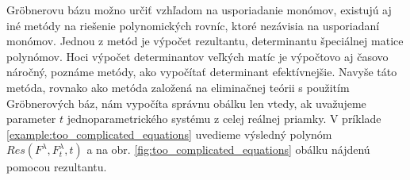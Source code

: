 Gröbnerovu bázu možno určiť vzhľadom na usporiadanie monómov, existujú aj iné metódy na riešenie polynomických rovníc, ktoré nezávisia na usporiadaní monómov. Jednou z metód je výpočet rezultantu, determinantu špeciálnej matice polynómov.
Hoci výpočet determinantov veľkých matíc je výpočtovo aj časovo náročný, poznáme metódy, ako vypočítať determinant efektívnejšie. Navyše táto metóda, rovnako ako metóda založená na eliminačnej teórii s použitím Gröbnerových báz, nám vypočíta správnu obálku len vtedy, ak uvažujeme parameter $t$ jednoparametrického systému z celej reálnej priamky. 
V príklade \ref{example:too_complicated_equations} uvedieme výsledný polynóm $Res(F^\lambda , F_t^\lambda , t)$ a na obr. \ref{fig:too_complicated_equations} obálku nájdenú pomocou rezultantu. 

